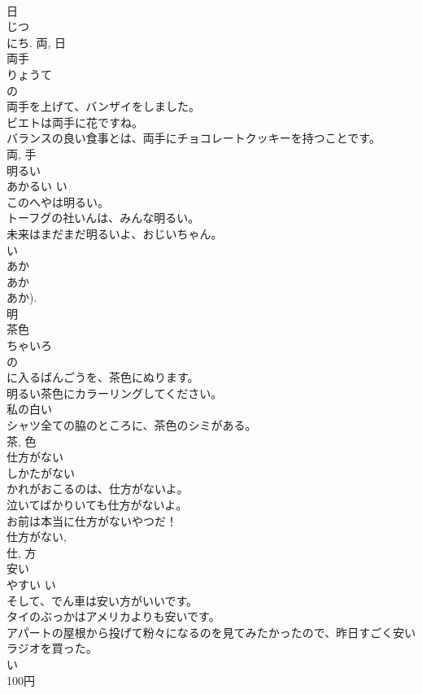 \documentclass[8pt]{extreport}
\begin{document}
\begin{CJK}{UTF8}{min}
\\	日 
\\	じつ 
\\	にち.	両, 日	
\\	両手	
\\	りょうて	
\\	の 
\\	両手を上げて、バンザイをしました。	
\\	ビエトは両手に花ですね。	
\\	バランスの良い食事とは、両手にチョコレートクッキーを持つことです。	
\\	両, 手	
\\	明るい	
\\	あかるい	い 
\\	このへやは明るい。	
\\	トーフグの社いんは、みんな明るい。	
\\	未来はまだまだ明るいよ、おじいちゃん。	
\\	い 
\\	あか 
\\	あか 
\\	あか). 
\\	明	
\\	茶色	
\\	ちゃいろ	
\\	の 
\\	に入るばんごうを、茶色にぬります。	
\\	明るい茶色にカラーリングしてください。	
\\	私の白い
\\	シャツ全ての脇のところに、茶色のシミがある。	
\\	茶, 色	
\\	仕方がない	
\\	しかたがない	
\\	かれがおこるのは、仕方がないよ。	
\\	泣いてばかりいても仕方がないよ。	
\\	お前は本当に仕方がないやつだ！	
\\	仕方がない, 
\\	仕, 方	
\\	安い	
\\	やすい	い 
\\	そして、でん車は安い方がいいです。	
\\	タイのぶっかはアメリカよりも安いです。	
\\	アパートの屋根から投げて粉々になるのを見てみたかったので、昨日すごく安いラジオを買った。	
\\	い 
\\	100円 

\end{CJK}
\end{document}
